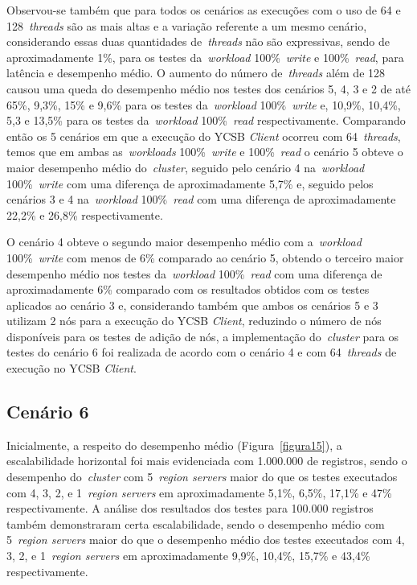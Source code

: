 \documentclass[12pt]{article}
\begin{document}
Observou-se também que para todos os cenários as execuções com o uso de 64 e 128~\emph{threads} são as mais altas e a variação referente a um mesmo cenário, considerando essas duas quantidades de~\emph{threads} não são expressivas, sendo de aproximadamente 1\%, para os testes da~\emph{workload} 100\%~\emph{write} e 100\%~\emph{read}, para latência e desempenho médio. 
O aumento do número de~\emph{threads} além de 128 causou uma queda do desempenho médio nos testes dos cenários 5, 4, 3 e 2 de até 65\%, 9,3\%, 15\% e 9,6\% para os testes da~\emph{workload} 100\%~\emph{write} e, 10,9\%, 10,4\%, 5,3 e 13,5\% para os testes da~\emph{workload} 100\%~\emph{read} respectivamente. Comparando então os 5 cenários em que a execução do YCSB \emph{Client} ocorreu com 64~\emph{threads}, temos que em ambas as~\emph{workloads} 100\%~\emph{write} e 100\%~\emph{read} o cenário 5 obteve o maior desempenho médio do~\emph{cluster}, seguido pelo cenário 4 na~\emph{workload} 100\%~\emph{write} com uma diferença de aproximadamente 5,7\% e, seguido pelos cenários 3 e 4 na~\emph{workload} 100\%~\emph{read} com uma diferença de aproximadamente 22,2\% e 26,8\% respectivamente.

O cenário 4 obteve o segundo maior desempenho médio com a~\emph{workload} 100\%~\emph{write} com menos de 6\% comparado ao cenário 5, obtendo o terceiro maior desempenho médio nos testes da~\emph{workload} 100\%~\emph{read} com uma diferença de aproximadamente 6\% comparado com os resultados obtidos com os testes aplicados ao cenário 3 e, considerando também que ambos os cenários 5 e 3 utilizam 2 nós para a execução do YCSB \emph{Client}, reduzindo o número de nós disponíveis para os testes de adição de nós, a implementação do~\emph{cluster} para os testes do cenário 6 foi realizada de acordo com o cenário 4 e com 64~\emph{threads} de execução no YCSB \emph{Client}.

\subsection{Cenário 6}
\label{subsec:resultado-cenario-6}

Inicialmente, a respeito do desempenho médio (Figura~\ref{figura15}), a escalabilidade horizontal foi mais evidenciada com 1.000.000 de registros, sendo o desempenho do~\emph{cluster} com 5~\emph{region servers} maior do que os testes executados com 4, 3, 2, e 1~\emph{region servers} em aproximadamente 5,1\%, 6,5\%, 17,1\% e 47\% respectivamente. A análise dos resultados dos testes para 100.000 registros também demonstraram certa escalabilidade, sendo o desempenho médio com 5~\emph{region servers} maior do que o desempenho médio dos testes executados com 4, 3, 2, e 1~\emph{region servers} em aproximadamente 9,9\%, 10,4\%, 15,7\% e 43,4\% respectivamente.
\end{document}
